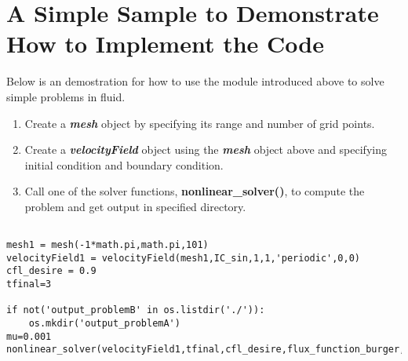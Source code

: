 \documentclass[11pt]{article}
\begin{document}
\section{A Simple Sample to Demonstrate How to Implement the Code} 
    Below is an demostration for how to use the module introduced above to solve simple problems in fluid.
    \begin{enumerate}
        \item Create a \textbf{\textit{mesh}} object by specifying its range and number of grid points.
        \item Create a \textbf{\textit{velocityField}} object using the \textbf{\textit{mesh}} object above and specifying initial condition and boundary condition.
        \item Call one of the solver functions, \textbf{nonlinear\_solver()}, to compute the problem and get output in specified directory.
    \end{enumerate}

    \begin{lstlisting}[frame=single]  % Start your code-block

mesh1 = mesh(-1*math.pi,math.pi,101)
velocityField1 = velocityField(mesh1,IC_sin,1,1,'periodic',0,0)
cfl_desire = 0.9
tfinal=3

if not('output_problemB' in os.listdir('./')):
    os.mkdir('output_problemA')
mu=0.001
nonlinear_solver(velocityField1,tfinal,cfl_desire,flux_function_burger,mu,'output_problemB')
    \end{lstlisting}
\end{document}
